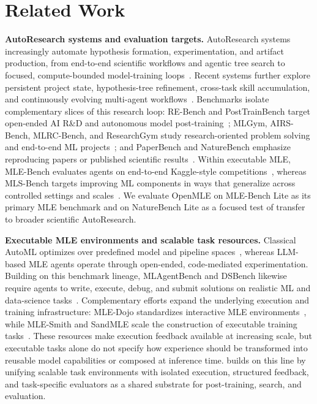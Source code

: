\section{Related Work}

\textbf{AutoResearch systems and evaluation targets.}
AutoResearch systems increasingly automate hypothesis formation, experimentation, and artifact production, from end-to-end scientific workflows and agentic tree search to focused, compute-bounded model-training loops~\citep{lu2024aiscientist,yamada2025aiscientistv2,karpathy2026autoresearch}.
Recent systems further explore persistent project state, hypothesis-tree refinement, cross-task skill accumulation, and continuously evolving multi-agent workflows~\citep{chen2026toward,jin2026hypothesistree,kim2026haste,zhu2026evomaster}.
Benchmarks isolate complementary slices of this research loop: RE-Bench and PostTrainBench target open-ended AI R\&D and autonomous model post-training~\citep{wijk2025rebench,rank2026posttrainbench}; MLGym, AIRS-Bench, MLRC-Bench, and ResearchGym study research-oriented problem solving and end-to-end ML projects~\citep{nathani2025mlgym,lupidi2026airs,zhang2025mlrcbench,garikaparthi2026researchgym}; and PaperBench and NatureBench emphasize reproducing papers or published scientific results~\citep{starace2025paperbench,wang2026naturebench}.
Within executable MLE, MLE-Bench evaluates agents on end-to-end Kaggle-style competitions~\citep{chan2024mlebench}, whereas MLS-Bench targets improving ML components in ways that generalize across controlled settings and scales~\citep{lyu2026mlsbench}.
We evaluate OpenMLE on MLE-Bench Lite as its primary MLE benchmark and on NatureBench Lite as a focused test of transfer to broader scientific AutoResearch.

\textbf{Executable MLE environments and scalable task resources.}
Classical AutoML optimizes over predefined model and pipeline spaces~\citep{thornton2013autoweka,feurer2015autosklearn,olson2016tpot,erickson2020autogluon}, whereas LLM-based MLE agents operate through open-ended, code-mediated experimentation.
Building on this benchmark lineage, MLAgentBench and DSBench likewise require agents to write, execute, debug, and submit solutions on realistic ML and data-science tasks~\citep{huang2023mlagentbench,jing2024dsbench}.
Complementary efforts expand the underlying execution and training infrastructure: MLE-Dojo standardizes interactive MLE environments~\citep{qiang2025mledojo}, while MLE-Smith and SandMLE scale the construction of executable training tasks~\citep{qiang2025mlesmith,zhou2026sandmle}.
These resources make execution feedback available at increasing scale, but executable tasks alone do not specify how experience should be transformed into reusable model capabilities or composed at inference time.
\openmlegym{} builds on this line by unifying scalable task environments with isolated execution, structured feedback, and task-specific evaluators as a shared substrate for post-training, search, and evaluation.

